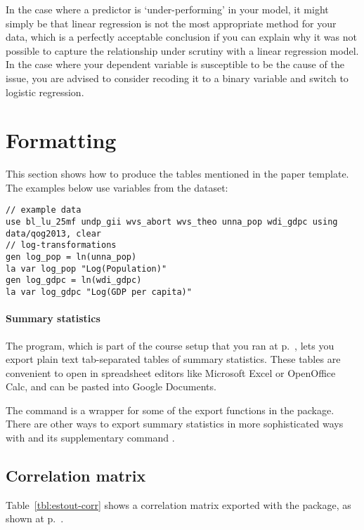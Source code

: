 In the case where a predictor is `under-performing' in your model, it might simply be that linear regression is not the most appropriate method for your data, which is a perfectly acceptable conclusion if you can explain why it was not possible to capture the relationship under scrutiny with a linear regression model. In the case where your dependent variable is susceptible to be the cause of the issue, you are advised to consider recoding it to a binary variable and switch to logistic regression.

%

\section{Formatting}

This section shows how to produce the tables mentioned in the paper template. The examples below use variables from the \qog{} dataset:

\begin{verbatim}
// example data
use bl_lu_25mf undp_gii wvs_abort wvs_theo unna_pop wdi_gdpc using data/qog2013, clear
// log-transformations
gen log_pop = ln(unna_pop)
la var log_pop "Log(Population)"
gen log_gdpc = ln(wdi_gdpc)
la var log_gdpc "Log(GDP per capita)"
\end{verbatim}

\paragraph{Summary statistics}

The  program, which is part of the course setup that you ran at p.~\pageref{sec:course-setup}, lets you export plain text tab-separated tables of summary statistics. These tables are convenient to open in spreadsheet editors like Microsoft Excel or OpenOffice Calc, and can be pasted into Google Documents.

The  command is a wrapper for some of the export functions in the  package. There are other ways to export summary statistics in more sophisticated ways with  and its supplementary command .

\subsection{Correlation matrix}%

Table~\ref{tbl:estout-corr} shows a correlation matrix exported with the  package, as shown at p.~\pageref{tbl:correlate_export}. 

